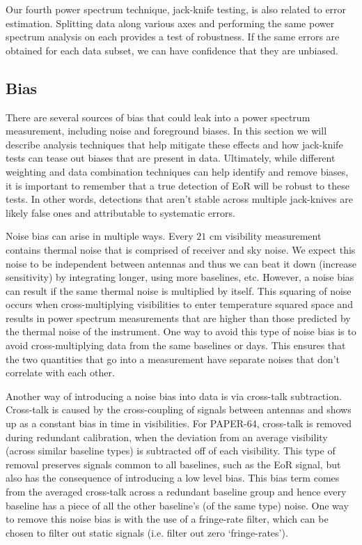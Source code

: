 \documentclass[preprint2,numberedappendix,tighten,twocolappendix]{aastex6}  %
\begin{document}
Our fourth power spectrum technique, jack-knife testing, is also related to error estimation. Splitting data along various axes and performing the same power spectrum analysis on each provides a test of robustness. If the same errors are obtained for each data subset, we can have confidence that they are unbiased.

\subsection{Bias}
\label{sec:BiasOverview}

There are several sources of bias that could leak into a power spectrum measurement, including noise and foreground biases. In this section we will describe analysis techniques that help mitigate these effects and how jack-knife tests can tease out biases that are present in data. Ultimately, while different weighting and data combination techniques can help identify and remove biases, it is important to remember that a true detection of EoR will be robust to these tests. In other words, detections that aren't stable across multiple jack-knives are likely false ones and attributable to systematic errors.

Noise bias can arise in multiple ways. Every $21$ cm visibility measurement contains thermal noise that is comprised of receiver and sky noise. We expect this noise to be independent between antennas and thus we can beat it down (increase sensitivity) by integrating longer, using more baselines, etc. However, a noise bias can result if the same thermal noise is multiplied by itself. This squaring of noise occurs when cross-multiplying visibilities to enter temperature squared space and results in power spectrum measurements that are higher than those predicted by the thermal noise of the instrument. One way to avoid this type of noise bias is to avoid cross-multiplying data from the same baselines or days. This ensures that the two quantities that go into a measurement have separate noises that don't correlate with each other. 

Another way of introducing a noise bias into data is via cross-talk subtraction. Cross-talk is caused by the cross-coupling of signals between antennas and shows up as a constant bias in time in visibilities. For PAPER-64, cross-talk is removed during redundant calibration, when the deviation from an average visibility (across similar baseline types) is subtracted off of each visibility. This type of removal preserves signals common to all baselines, such as the EoR signal, but also has the consequence of introducing a low level bias. This bias term comes from the averaged cross-talk across a redundant baseline group and hence every baseline has a piece of all the other baseline's (of the same type) noise. One way to remove this noise bias is with the use of a fringe-rate filter, which can be chosen to filter out static signals (i.e. filter out zero `fringe-rates').
\end{document}

